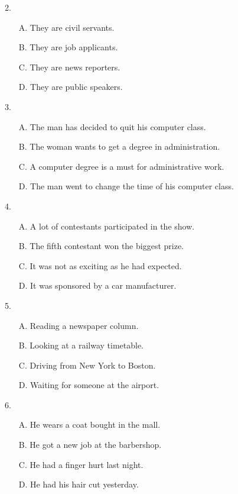 \documentclass[UTF8,11pt]{ctexart}
\begin{document}
2.


\begin{itemize}[leftmargin=2em,itemsep=.2em,topsep=.4em]\item[A.] They are civil servants.
\item[B.] They are job applicants.
\item[C.] They are news reporters.
\item[D.] They are public speakers.
\end{itemize}

3.


\begin{itemize}[leftmargin=2em,itemsep=.2em,topsep=.4em]\item[A.] The man has decided to quit his computer class.
\item[B.] The woman wants to get a degree in administration.
\item[C.] A computer degree is a must for administrative work.
\item[D.] The man went to change the time of his computer class.
\end{itemize}

4.


\begin{itemize}[leftmargin=2em,itemsep=.2em,topsep=.4em]\item[A.] A lot of contestants participated in the show.
\item[B.] The fifth contestant won the biggest prize.
\item[C.] It was not as exciting as he had expected.
\item[D.] It was sponsored by a car manufacturer.
\end{itemize}

5.


\begin{itemize}[leftmargin=2em,itemsep=.2em,topsep=.4em]\item[A.] Reading a newspaper column.
\item[B.] Looking at a railway timetable.
\item[C.] Driving from New York to Boston.
\item[D.] Waiting for someone at the airport.
\end{itemize}

6.


\begin{itemize}[leftmargin=2em,itemsep=.2em,topsep=.4em]\item[A.] He wears a coat bought in the mall.
\item[B.] He got a new job at the barbershop.
\item[C.] He had a finger hurt last night.
\item[D.] He had his hair cut yesterday.
\end{itemize}
\end{document}

